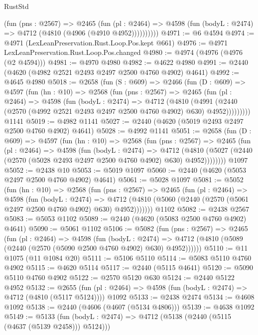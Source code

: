 \begin{lexlean}{RustStd}
\begin{coremodule}
            (fun (pns : @2567) =>
            @2465
              (fun (pl : @2464) =>
              @4598 (fun (bodyL : @2474) => @4712 (@4810 (@4906 (@4910 @4952))))))))))
@4971 := @6 @4594
@4974 := @4971 (LexLeanPreservation.Rust.Loop.Pos.kept @661)
@4976 := @4971 LexLeanPreservation.Rust.Loop.Pos.changed
@4980 := @4974 (@4976 (@4976 (@2 @4594)))
@4981 := @4970 @4980
@4982 := @4622 @4980
@4991 := @2440 (@4620 (@4982 @2521 @2493 @2497 @2500 @4760 @4902) @4641)
@4992 := @4645 @4980
@5018 := @2658
    (fun (S : @609) =>
    @2466
      (fun (D : @609) =>
      @4597
        (fun (hn : @10) =>
        @2568
          (fun (pns : @2567) =>
          @2465
            (fun (pl : @2464) =>
            @4598
              (fun (bodyL : @2474) =>
              @4712
                (@4810
                  (@4991
                    (@2440 (@2570 (@4992 @2521 @2493 @2497 @2500 @4760 @4902) @630) @4952)))))))))
    @1141
@5019 := @4982 @1141
@5027 := @2440 (@4620 (@5019 @2493 @2497 @2500 @4760 @4902) @4641)
@5028 := @4992 @1141
@5051 := @2658
    (fun (D : @609) =>
    @4597
      (fun (hn : @10) =>
      @2568
        (fun (pns : @2567) =>
        @2465
          (fun (pl : @2464) =>
          @4598
            (fun (bodyL : @2474) =>
            @4712
              (@4810 (@5027 (@2440 (@2570 (@5028 @2493 @2497 @2500 @4760 @4902) @630) @4952))))))))
    @1097
@5052 := @2438 @10
@5053 := @5019 @1097
@5060 := @2440 (@4620 (@5053 @2497 @2500 @4760 @4902) @4641)
@5061 := @5028 @1097
@5081 := @5052
    (fun (hn : @10) =>
    @2568
      (fun (pns : @2567) =>
      @2465
        (fun (pl : @2464) =>
        @4598
          (fun (bodyL : @2474) =>
          @4712 (@4810 (@5060 (@2440 (@2570 (@5061 @2497 @2500 @4760 @4902) @630) @4952)))))))
    @1102
@5082 := @2438 @2567
@5083 := @5053 @1102
@5089 := @2440 (@4620 (@5083 @2500 @4760 @4902) @4641)
@5090 := @5061 @1102
@5106 := @5082
    (fun (pns : @2567) =>
    @2465
      (fun (pl : @2464) =>
      @4598
        (fun (bodyL : @2474) =>
        @4712 (@4810 (@5089 (@2440 (@2570 (@5090 @2500 @4760 @4902) @630) @4952))))))
@5110 := @11 @1075 (@11 @1084 @20)
@5111 := @5106 @5110
@5114 := @5083 @5110 @4760 @4902
@5115 := @4620 @5114
@5117 := @2440 (@5115 @4641)
@5120 := @5090 @5110 @4760 @4902
@5122 := @2570 @5120 @630
@5124 := @2440 @5122 @4952
@5132 := @2655
    (fun (pl : @2464) => @4598 (fun (bodyL : @2474) => @4712 (@4810 (@5117 @5124))))
    @1092
@5133 := @2438 @2474
@5134 := @4608 @1092
@5138 := @2440 (@4606 (@4607 (@5134 @4806)))
@5139 := @4638 @1092
@5149 := @5133
    (fun (bodyL : @2474) => @4712 (@5138 (@2440 (@5115 (@4637 (@5139 @2458))) @5124)))

\end{coremodule}
\end{lexlean}
